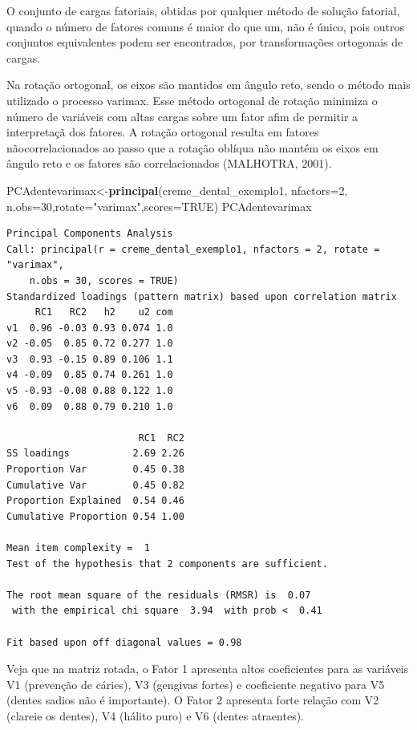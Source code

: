 \documentclass[12pt,brazil,oneside]{book}
\newenvironment{Shaded}{\begin{snugshade}}{\end{snugshade}}
\newcommand{\DataTypeTok}[1]{\textcolor[rgb]{0.13,0.29,0.53}{#1}}
\newcommand{\DecValTok}[1]{\textcolor[rgb]{0.00,0.00,0.81}{#1}}
\newcommand{\KeywordTok}[1]{\textcolor[rgb]{0.13,0.29,0.53}{\textbf{#1}}}
\newcommand{\NormalTok}[1]{#1}
\newcommand{\OtherTok}[1]{\textcolor[rgb]{0.56,0.35,0.01}{#1}}
\newcommand{\StringTok}[1]{\textcolor[rgb]{0.31,0.60,0.02}{#1}}
\begin{document}
O conjunto de cargas fatoriais, obtidas por qualquer método de solução fatorial, quando o número de fatores comuns é maior do que um, não é único, pois outros conjuntos equivalentes podem ser encontrados, por transformações ortogonais de cargas.

Na rotação ortogonal, os eixos são mantidos em ângulo reto, sendo o método mais utilizado o processo varimax. Esse método ortogonal de rotação minimiza o número de variáveis com altas cargas sobre um fator afim de permitir a interpretaçã dos fatores. A rotação ortogonal resulta em fatores nãocorrelacionados ao passo que a rotação oblíqua não mantém os eixos em ângulo reto e os fatores são correlacionados (MALHOTRA, 2001).

\begin{Shaded}
\begin{Highlighting}[]
\NormalTok{PCAdentevarimax<-}\KeywordTok{principal}\NormalTok{(creme_dental_exemplo1, }\DataTypeTok{nfactors=}\DecValTok{2}\NormalTok{,}
            \DataTypeTok{n.obs=}\DecValTok{30}\NormalTok{,}\DataTypeTok{rotate=}\StringTok{"varimax"}\NormalTok{,}\DataTypeTok{scores=}\OtherTok{TRUE}\NormalTok{)}
\NormalTok{PCAdentevarimax}
\end{Highlighting}
\end{Shaded}

\begin{verbatim}
Principal Components Analysis
Call: principal(r = creme_dental_exemplo1, nfactors = 2, rotate = "varimax", 
    n.obs = 30, scores = TRUE)
Standardized loadings (pattern matrix) based upon correlation matrix
     RC1   RC2   h2    u2 com
v1  0.96 -0.03 0.93 0.074 1.0
v2 -0.05  0.85 0.72 0.277 1.0
v3  0.93 -0.15 0.89 0.106 1.1
v4 -0.09  0.85 0.74 0.261 1.0
v5 -0.93 -0.08 0.88 0.122 1.0
v6  0.09  0.88 0.79 0.210 1.0

                       RC1  RC2
SS loadings           2.69 2.26
Proportion Var        0.45 0.38
Cumulative Var        0.45 0.82
Proportion Explained  0.54 0.46
Cumulative Proportion 0.54 1.00

Mean item complexity =  1
Test of the hypothesis that 2 components are sufficient.

The root mean square of the residuals (RMSR) is  0.07 
 with the empirical chi square  3.94  with prob <  0.41 

Fit based upon off diagonal values = 0.98
\end{verbatim}

Veja que na matriz rotada, o Fator 1 apresenta altos coeficientes para as variáveis V1 (prevenção de cáries), V3 (gengivas fortes) e coeficiente negativo para V5 (dentes sadios não é importante). O Fator 2 apresenta forte relação com V2 (clareie os dentes), V4 (hálito puro) e V6 (dentes atraentes).
\end{document}

